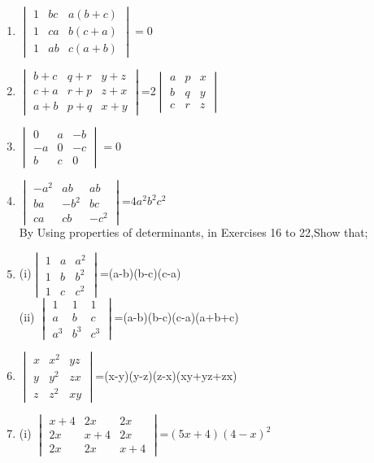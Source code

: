 \begin{enumerate}[label=\arabic*.,ref=\thesubsection.\theenumi]
\item $\begin{vmatrix}1&bc&a(b+c)\\1&ca&b(c+a)\\1&ab&c(a+b)\end{vmatrix}=0$
\item $\begin{vmatrix}b+c& q+r& y+z\\c+a& r+p& z+x\\a+b& p+q& x+y\end{vmatrix}$=2$\begin{vmatrix} a&p&x\\b&q&y\\c&r&z\end{vmatrix}$ 
\item $\begin{vmatrix}0&a&-b\\-a&0&-c\\b&c&0\end{vmatrix}=0$
\item $\begin{vmatrix}-a^2&ab&ab\\ ba&-b^2&bc\\ ca&cb&-c^2\end{vmatrix}$=$4a^2b^2c^2$\\
By Using properties of determinants, in Exercises 16 to 22,Show that;
\item (i)$\begin{vmatrix}1&a&a^2\\1&b&b^2\\1&c&c^2\end{vmatrix}$=(a-b)(b-c)(c-a)\\
(ii) $\begin{vmatrix}1&1&1 \\ a&b&c \\ a^3&b^3&c^3\end{vmatrix}$=(a-b)(b-c)(c-a)(a+b+c)
\item $\begin{vmatrix}x&x^2&yz \\ y&y^2&zx \\ z&z^2&xy\end{vmatrix}$=(x-y)(y-z)(z-x)(xy+yz+zx)
\item (i) $\begin{vmatrix}x+4&2x&2x \\ 2x&x+4&2x \\ 2x&2x&x+4\end{vmatrix}$=$(5x+4)(4-x)^2$\\

\end{enumerate}
